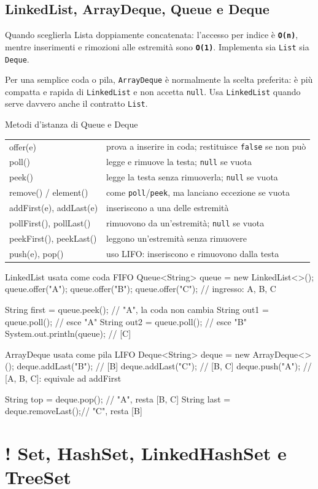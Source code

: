 ﻿\documentclass[10pt,a4paper]{article}
\newcommand{\cmd}[1]{\texttt{#1}}
\newcommand{\complexity}[1]{\textcolor{accent}{\texttt{\textbf{#1}}}}
\DeclareRobustCommand{\exammark}{%
  \texorpdfstring{\textcolor{examred}{\bfseries\Large !}\hspace{.18em}}{! }%
}
\newcommand{\topicsection}[1]{\Needspace{12\baselineskip}\section{#1}}
\newcommand{\topicsubsection}[1]{\Needspace{10\baselineskip}\subsection{#1}}
\newenvironment{topicblock}{%
  \par\medskip\noindent\begin{minipage}{\textwidth}%
}{%
  \end{minipage}\par\medskip%
}
\begin{document}
\begin{topicblock}
\topicsubsection{LinkedList, ArrayDeque, Queue e Deque}
\begin{difference}{Quando sceglierla}
Lista doppiamente concatenata: l'accesso per indice è \complexity{O(n)},
mentre inserimenti e rimozioni alle estremità sono \complexity{O(1)}.
Implementa sia \cmd{List} sia \cmd{Deque}.

Per una semplice coda o pila, \cmd{ArrayDeque} è normalmente la scelta
preferita: è più compatta e rapida di \cmd{LinkedList} e non accetta
\cmd{null}. Usa \cmd{LinkedList} quando serve davvero anche il contratto
\cmd{List}.
\end{difference}

\begin{concept}{Metodi d'istanza di Queue e Deque}
\begin{tabularx}{\textwidth}{>{\ttfamily\small}p{4cm} X}
offer(e) & prova a inserire in coda; restituisce \cmd{false} se non può \\
poll() & legge e rimuove la testa; \cmd{null} se vuota \\
peek() & legge la testa senza rimuoverla; \cmd{null} se vuota \\
remove() / element() & come \cmd{poll}/\cmd{peek}, ma lanciano eccezione se vuota \\
addFirst(e), addLast(e) & inseriscono a una delle estremità \\
pollFirst(), pollLast() & rimuovono da un'estremità; \cmd{null} se vuota \\
peekFirst(), peekLast() & leggono un'estremità senza rimuovere \\
push(e), pop() & uso LIFO: inseriscono e rimuovono dalla testa \\
\end{tabularx}
\end{concept}

\begin{codebox}{LinkedList usata come coda FIFO}
Queue<String> queue = new LinkedList<>();
queue.offer("A");
queue.offer("B");
queue.offer("C"); // ingresso: A, B, C

String first = queue.peek(); // "A", la coda non cambia
String out1 = queue.poll();  // esce "A"
String out2 = queue.poll();  // esce "B"
System.out.println(queue);   // [C]
\end{codebox}

\begin{codebox}{ArrayDeque usata come pila LIFO}
Deque<String> deque = new ArrayDeque<>();
deque.addLast("B");  // [B]
deque.addLast("C");  // [B, C]
deque.push("A");     // [A, B, C]: equivale ad addFirst

String top = deque.pop();        // "A", resta [B, C]
String last = deque.removeLast();// "C", resta [B]
\end{codebox}

\end{topicblock}
\topicsection{\exammark Set, HashSet, LinkedHashSet e TreeSet}
\end{document}
